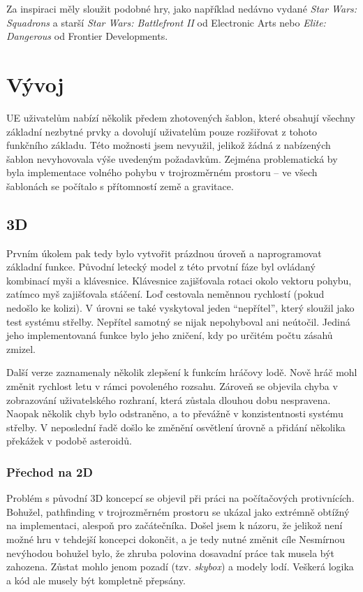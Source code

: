 \documentclass[12pt,a4paper,hidelinks]{article}
\begin{document}
Za inspiraci měly sloužit podobné hry, jako například nedávno vydané \textit{Star Wars: Squadrons}\cite{squadrons} a starší \textit{Star Wars: Battlefront II}\cite{bf2} od Electronic Arts nebo \textit{Elite: Dangerous}\cite{elite} od Frontier Developments.

\section{Vývoj}
UE uživatelům nabízí několik předem zhotovených šablon\cite{uedocs:templates}, které obsahují všechny základní nezbytné prvky a dovolují uživatelům pouze rozšiřovat z tohoto funkčního základu. Této možnosti jsem nevyužil, jelikož žádná z nabízených šablon nevyhovovala výše uvedeným požadavkům. Zejména problematická by byla implementace volného pohybu v trojrozměrném prostoru – ve všech šablonách se počítalo s přítomností země a gravitace.

\subsection{3D}
Prvním úkolem pak tedy bylo vytvořit prázdnou úroveň a naprogramovat základní funkce. Původní letecký model z této prvotní fáze byl ovládaný kombinací myši a klávesnice. Klávesnice zajišťovala rotaci okolo vektoru pohybu, zatímco myš zajišťovala stáčení. Loď cestovala neměnnou rychlostí (pokud nedošlo ke kolizi). V úrovni se také vyskytoval jeden \enquote{nepřítel}, který sloužil jako test systému střelby. Nepřítel samotný se nijak nepohyboval ani neútočil. Jediná jeho implementovaná funkce bylo jeho zničení, kdy po určitém počtu zásahů zmizel.

Další verze zaznamenaly několik zlepšení k funkcím hráčovy lodě. Nově hráč mohl změnit rychlost letu v rámci povoleného rozsahu. Zároveň se objevila chyba v zobrazování uživatelského rozhraní, která zůstala dlouhou dobu nespravena. Naopak několik chyb bylo odstraněno, a to převážně v konzistentnosti systému střelby. V neposlední řadě došlo ke změnění osvětlení úrovně a přidání několika překážek v podobě asteroidů.


\subsubsection{Přechod na 2D}
Problém s původní 3D koncepcí se objevil při práci na počítačových protivnících. Bohužel, pathfinding v trojrozměrném prostoru se ukázal jako extrémně obtížný na implementaci, alespoň pro začátečníka. Došel jsem k názoru, že jelikož není možné hru v tehdejší koncepci dokončit, a je tedy nutné změnit cíle Nesmírnou nevýhodou bohužel bylo, že zhruba polovina dosavadní práce tak musela být zahozena. Zůstat mohlo jenom pozadí (tzv. \textit{skybox}) a modely lodí. Veškerá logika a kód ale musely být kompletně přepsány.
\end{document}
